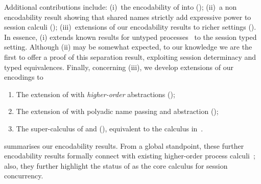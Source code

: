 %
%
%
%

Additional contributions include: (i)~the encodability of \HO into \sessp (); (ii)~a non encodability result showing that shared names strictly add expressive power to session calculi ();
(iii)~extensions of our encodability results to richer settings (). 
In essence, (i) extends known  results for untyped processes~\cite{SangiorgiD:expmpa} to the session typed setting.
Although (ii) may be somewhat expected, to our knowledge we are the first to offer a proof of this separation result, 
exploiting session determinacy and typed equivalences.
Finally, concerning (iii), we develop extensions of our encodings to 
\begin{enumerate}[-]
\item The extension of \HOp with \emph{higher-order} abstractions (\HOpp); 
\item The extension of \HOp with polyadic name passing and abstraction (\pHOp); 
\item The super-calculus of \HOpp and \pHOp (\PHOpp), equivalent to the calculus in~\cite{tlca07}.
\end{enumerate}
 summarises %
our encodability results. From a global standpoint, 
these further encodability results formally connect \HOp with existing higher-order process calculi~\cite{tlca07}; 
also, they further highlight the status of \HO as the core calculus for session concurrency.



